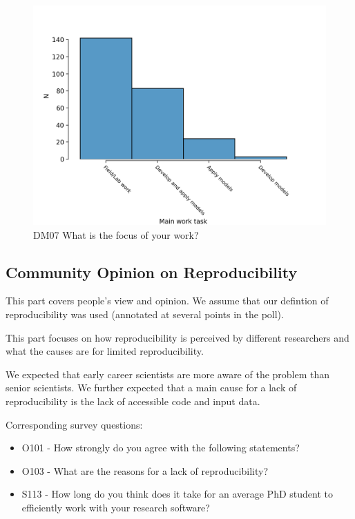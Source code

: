 \documentclass{article}
\begin{document}
\begin{figure}[!p]
    \centering
    \includegraphics[width=\textwidth]{../figs/DM07.png}
	\caption{DM07 What is the focus of your work?}
    \label{fig:dm07}
\end{figure}
\newpage

\subsection{Community Opinion on Reproducibility}
This part covers people's view and opinion. We assume that our defintion of reproducibility was used (annotated at several points in the poll).

This part focuses on how reproducibility is perceived by different researchers and what the causes are for limited reproducibility.

We expected that early career scientists are more aware of the problem than senior scientists. We further expected that a main cause for a lack of reproducibility is the lack of accessible code and input data.

Corresponding survey questions:
\begin{itemize}
	\item O101 - How strongly do you agree with the following statements?
	\item O103 - What are the reasons for a lack of reproducibility?
	\item S113 - How long do you think does it take for an average PhD student to efficiently work with your research software?
\end{itemize}
\end{document}
